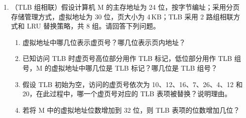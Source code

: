 \documentclass[12pt,a4paper]{ctexart}
\begin{document}
\begin{enumerate}[leftmargin=*,resume]
\begin{lstlisting}[language=C]
for (i = 0; i < 24; i++)
    for (j = 0; j < 64; j++) a[i][j] = 10;
\end{lstlisting}

已知二维数组 \texttt{a} 按行优先存放，在虚拟地址空间中分配的起始地址为 0042\,2000H，\texttt{sizeof(int)=4}，假定在 M 上执行上述程序段之前数组 \texttt{a} 不在主存，且在该程序段执行过程中不会发生页面置换。请回答下列问题。

\begin{enumerate}[label=(\arabic*)]
\item 数组 \texttt{a} 分为几个页面存储？对于数组 \texttt{a} 的访问，会发生几次缺页异常？页故障地址各是什么？
\item 不考虑变量 \texttt{i} 和 \texttt{j}，该程序段的数据访问是否具有时间局部性？为什么？
\item 计算机 M 的虚拟地址（$A_{31}\sim A_0$）中哪几位用作块内地址？哪几位用作 Cache 组号？\texttt{a[1][0]} 的虚拟地址是多少？其所在主存块对应的 Cache 组号是多少？
\item 数组 \texttt{a} 占用多少主存块？假设上述程序段执行过程中数组 \texttt{a} 的访问不会和其他数据发生 Cache 访问冲突，则数组 \texttt{a} 的 Cache 命中率是多少？若将循环中 \texttt{i} 和 \texttt{j} 的次序按如下方式调换：

\begin{lstlisting}[language=C]
for (j = 0; j < 64; j++)
    for (i = 0; i < 24; i++) a[i][j] = 10;
\end{lstlisting}

则数组 \texttt{a} 的 Cache 命中率又是多少？
\end{enumerate}

\item （TLB 组相联）假设计算机 M 的主存地址为 24 位，按字节编址；采用分页存储管理方式，虚拟地址为 30 位，页大小为 4\,KB；TLB 采用 2 路组相联方式和 LRU 替换策略，共 8 组。请回答下列问题。

\begin{enumerate}[label=(\arabic*)]
\item 虚拟地址中哪几位表示虚页号？哪几位表示页内地址？
\item 已知访问 TLB 时虚页号高位部分用作 TLB 标记，低位部分用作 TLB 组号，M 的虚拟地址中哪几位是 TLB 标记？哪几位是 TLB 组号？
\item 假设 TLB 初始为空，访问的虚页号依次为 10、12、16、7、26、4、12 和 20，在此过程中，哪一个虚页号对应的 TLB 表项被替换？说明理由。
\item 若将 M 中的虚拟地址位数增加到 32 位，则 TLB 表项的位数增加几位？
\end{enumerate}

\end{enumerate}
\end{document}
